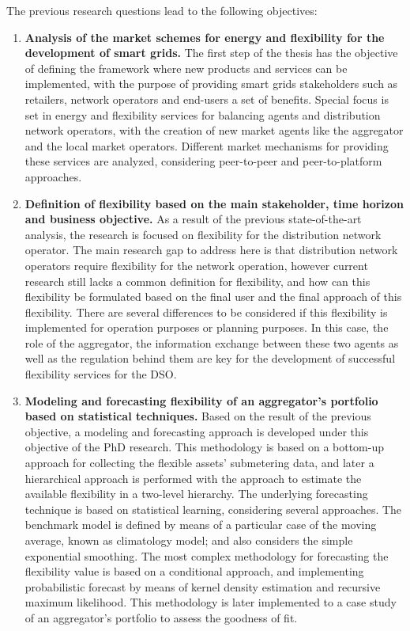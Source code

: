 The previous research questions lead to the following objectives:
\begin{enumerate}
\item \textbf{Analysis of the market schemes for energy and flexibility for the development of smart grids.} The first step of the thesis has the objective of defining the framework where new products and services can be implemented, with the purpose of providing smart grids stakeholders such as retailers, network operators and end-users a set of benefits. Special focus is set in energy and flexibility services for balancing agents and distribution network operators, with the creation of new market agents like the aggregator and the local market operators. Different market mechanisms for providing these services are analyzed, considering peer-to-peer and peer-to-platform approaches. 
\item \textbf{Definition of flexibility based on the main stakeholder, time horizon and business objective.} As a result of the previous state-of-the-art analysis, the research is focused on flexibility for the distribution network operator. The main research gap to address here is that distribution network operators require flexibility for the network operation, however current research still lacks a common definition for flexibility, and how can this flexibility be formulated based on the final user and the final approach of this flexibility. There are several differences to be considered if this flexibility is implemented for operation purposes or planning purposes. In this case, the role of the aggregator, the information exchange between these two agents as well as the regulation behind them are key for the development of successful flexibility services for the DSO.  
\item \textbf{Modeling and forecasting flexibility of an aggregator's portfolio based on statistical techniques.} Based on the result of the previous objective, a modeling and forecasting approach is developed under this objective of the PhD research. This methodology is based on a bottom-up approach for collecting the flexible assets' submetering data, and later a hierarchical approach is performed with the approach to estimate the available flexibility in a two-level hierarchy. The underlying forecasting technique is based on statistical learning, considering several approaches. The benchmark model is defined by means of a particular case of the moving average, known as climatology model; and also considers the simple exponential smoothing. The most complex methodology for forecasting the flexibility value is based on a conditional approach, and implementing probabilistic forecast by means of kernel density estimation and recursive maximum likelihood. This methodology is later implemented to a case study of an aggregator's portfolio to assess the goodness of fit. 

\end{enumerate}
